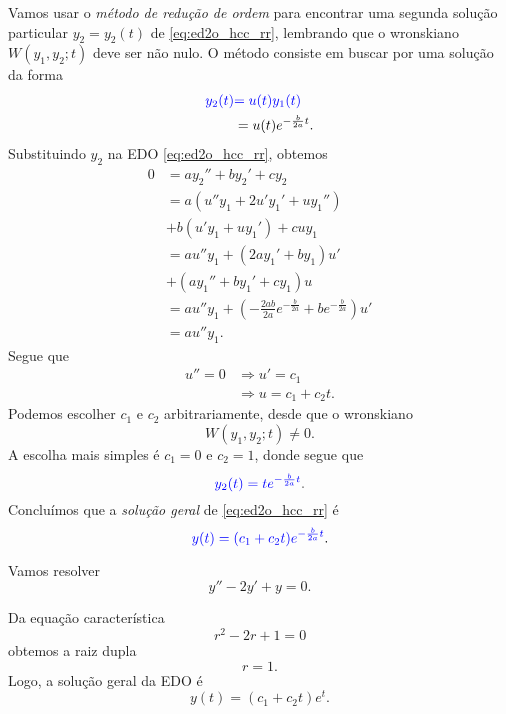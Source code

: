 Vamos usar o \emph{método de redução de ordem} para encontrar uma segunda solução particular $y_2 = y_2(t)$ de \eqref{eq:ed2o_hcc_rr}, lembrando que o wronskiano $W(y_1,y_2; t)$ deve ser não nulo. O método consiste em buscar por uma solução da forma
\begin{align}
  {\color{blue}y_2(t)} &{\color{blue}= u(t)y_1(t)} \\
                      &= u(t)e^{-\frac{b}{2a}t}.
\end{align}
Substituindo $y_2$ na EDO \eqref{eq:ed2o_hcc_rr}, obtemos
\begin{align}
  0 &= ay_2'' + by_2' + cy_2 \\
    &= a(u''y_1 + 2u'y_1' + uy_1'') \\
    &+ b(u'y_1 + uy_1') + cuy_1 \\
    &= au''y_1 + (2ay_1' + by_1)u' \\
    &+ (ay_1'' + by_1' + cy_1)u \\
    &= au''y_1 + \left(-\frac{2ab}{2a}e^{-\frac{b}{2a}} + be^{-\frac{b}{2a}}\right)u' \\
    &= au''y_1.
\end{align}
Segue que
\begin{align}
  u'' = 0  &\Rightarrow u' = c_1 \\
           &\Rightarrow u = c_1 + c_2t.
\end{align}
Podemos escolher $c_1$ e $c_2$ arbitrariamente, desde que o wronskiano
\begin{equation}
  W(y_1,y_2;t) \neq 0.
\end{equation}
A escolha mais simples é $c_1 = 0$ e $c_2 = 1$, donde segue que
\begin{equation}
  {\color{blue}y_2(t) = te^{-\frac{b}{2a}t}}.
\end{equation}
Concluímos que a \emph{solução geral} de \eqref{eq:ed2o_hcc_rr} é
\begin{equation}
  {\color{blue}y(t) = (c_1 + c_2t)e^{-\frac{b}{2a}t}}.
\end{equation}

\begin{ex}
  Vamos resolver
  \begin{equation}
    y'' -2y' + y = 0.
  \end{equation}

  Da equação característica
  \begin{equation}
    r^2 - 2r + 1 = 0
  \end{equation}
  obtemos a raiz dupla
  \begin{equation}
    r = 1.
  \end{equation}
  Logo, a solução geral da EDO é
  \begin{equation}
    y(t) = (c_1 + c_2t)e^{t}.
  \end{equation}
\end{ex}


